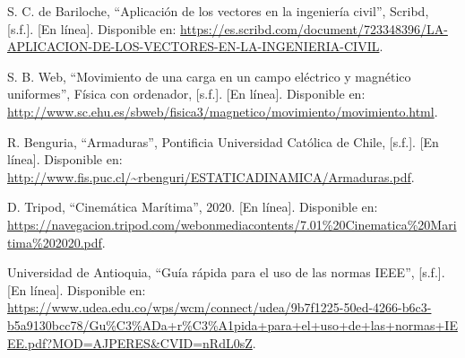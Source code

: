 \documentclass[12pt,a4paper]{article}
\begin{document}
\begin{thebibliography}{20}
S. C. de Bariloche, ``Aplicación de los vectores en la ingeniería civil'', Scribd, [s.f.]. [En línea]. Disponible en: \url{https://es.scribd.com/document/723348396/LA-APLICACION-DE-LOS-VECTORES-EN-LA-INGENIERIA-CIVIL}.

S. B. Web, ``Movimiento de una carga en un campo eléctrico y magnético uniformes'', Física con ordenador, [s.f.]. [En línea]. Disponible en: \url{http://www.sc.ehu.es/sbweb/fisica3/magnetico/movimiento/movimiento.html}.

R. Benguria, ``Armaduras'', Pontificia Universidad Católica de Chile, [s.f.]. [En línea]. Disponible en: \url{http://www.fis.puc.cl/~rbenguri/ESTATICADINAMICA/Armaduras.pdf}.

D. Tripod, ``Cinemática Marítima'', 2020. [En línea]. Disponible en: \url{https://navegacion.tripod.com/webonmediacontents/7.01%20Cinematica%20Maritima%202020.pdf}.

Universidad de Antioquia, ``Guía rápida para el uso de las normas IEEE'', [s.f.]. [En línea]. Disponible en: \url{https://www.udea.edu.co/wps/wcm/connect/udea/9b7f1225-50ed-4266-b6c3-b5a9130bcc78/Gu%C3%ADa+r%C3%A1pida+para+el+uso+de+las+normas+IEEE.pdf?MOD=AJPERES&CVID=nRdL0sZ}.

\end{thebibliography}
\end{document}
